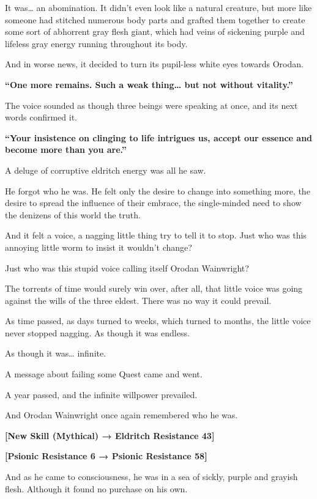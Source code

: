 \documentclass[a4paper,10pt]{book}
\begin{document}
It was… an abomination. It didn’t even look like a natural creature, but more like someone had stitched numerous body parts and grafted them together to create some sort of abhorrent gray flesh giant, which had veins of sickening purple and lifeless gray energy running throughout its body.\par
And in worse news, it decided to turn its pupil-less white eyes towards Orodan.\par
\textbf{“One more remains. Such a weak thing… but not without vitality.”}\par
The voice sounded as though three beings were speaking at once, and its next words confirmed it.\par
\textbf{“Your insistence on clinging to life intrigues us, accept our essence and become more than you are.”}\par
A deluge of corruptive eldritch energy was all he saw.\par
He forgot who he was. He felt only the desire to change into something more, the desire to spread the influence of their embrace, the single-minded need to show the denizens of this world the truth.\par
And it felt a voice, a nagging little thing try to tell it to stop. Just who was this annoying little worm to insist it wouldn’t change?\par
Just who was this stupid voice calling itself Orodan Wainwright?\par
The torrents of time would surely win over, after all, that little voice was going against the wills of the three eldest. There was no way it could prevail.\par
As time passed, as days turned to weeks, which turned to months, the little voice never stopped nagging. As though it was endless.\par
As though it was… infinite.\par
A message about failing some Quest came and went.\par
A year passed, and the infinite willpower prevailed.\par
And Orodan Wainwright once again remembered who he was.\par
\textbf{[New Skill (Mythical) → Eldritch Resistance 43]}\par
\textbf{[Psionic Resistance 6 → Psionic Resistance 58]}\par
And as he came to consciousness, he was in a sea of sickly, purple and grayish flesh. Although it found no purchase on his own.\par
\end{document}
